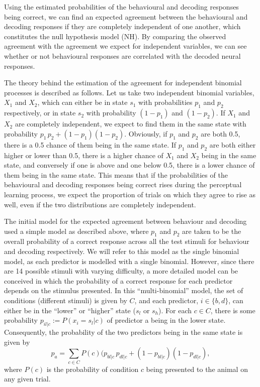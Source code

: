 Using the estimated probabilities of the behavioural and decoding responses being correct, we can find an expected agreement between the behavioural and decoding responses if they are completely independent of one another, which constitutes the null hypothesis model (NH).
By comparing the observed agreement with the agreement we expect for independent variables, we can see whether or not behavioural responses are correlated with the decoded neural responses.

The theory behind the estimation of the agreement for independent binomial processes is described as follows.
Let us take two independent binomial variables, $X_1$ and $X_2$, which can either be in state $s_1$ with probabilities $p_1$ and $p_2$ respectively, or in state $s_2$ with probability $(1-p_1)$ and $(1-p_2)$.
If $X_1$ and $X_2$ are completely independent, we expect to find them in the same state with probability $p_1 \, p_2 + (1-p_1) (1-p_2)$.
Obviously, if $p_1$ and $p_2$ are both 0.5, there is a 0.5 chance of them being in the same state.
If $p_1$ and $p_2$ are both either higher or lower than 0.5, there is a higher chance of $X_1$ and $X_2$ being in the same state, and conversely if one is above and one below 0.5, there is a lower chance of them being in the same state.
This means that if the probabilities of the behavioural and decoding responses being correct rises during the perceptual learning process, we expect the proportion of trials on which they agree to rise as well, even if the two distributions are completely independent.

The initial model for the expected agreement between behaviour and decoding used a simple model as described above, where $p_1$ and $p_2$ are taken to be the overall probability of a correct response across all the test stimuli for behaviour and decoding respectively.
We will refer to this model as the single binomial model, as each predictor is modelled with a single binomial.
However, since there are 14 possible stimuli with varying difficulty, a more detailed model can be conceived in which the probability of a correct response for each predictor depends on the stimulus presented.
In this ``multi-binomial'' model, the set of conditions (different stimuli) is given by $C$, and each predictor, $i\in\{b,d\}$, can either be in the ``lower'' or ``higher'' state ($s_l$ or $s_h$).
For each $c\in C$, there is some probability $p_{il|c} := P(x_i=s_l|c)$ of predictor a being in the lower state.
Consequently, the probability of the two predictors being in the same state is given by
$$p_a = \sum_{c\in C} P(c) (p_{bl|c} \, p_{dl|c} + (1-p_{bl|c}) (1-p_{dl|c}),$$
where $P(c)$ is the probability of condition $c$ being presented to the animal on any given trial.

